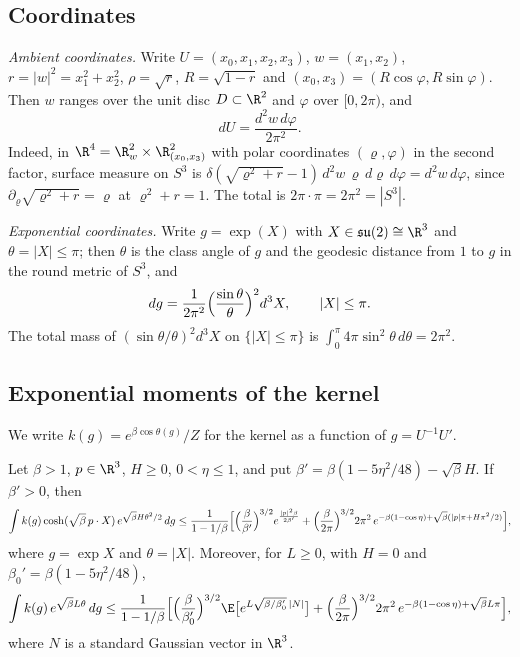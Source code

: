 \subsection{Coordinates}
\emph{Ambient coordinates.} Write $U=(x_0,x_1,x_2,x_3)$, $w=(x_1,x_2)$, $r=|w|^2=x_1^2+x_2^2$,
$\rho=\sqrt r$, $R=\sqrt{1-r}$ and $(x_0,x_3)=(R\cos\varphi,R\sin\varphi)$. Then $w$ ranges over the unit
disc $D\subset\R^2$ and $\varphi$ over $[0,2\pi)$, and
\begin{equation}\label{tu:U-eq-haar}
dU=\frac{d^2w\,d\varphi}{2\pi^2}.
\end{equation}
Indeed, in $\R^4=\R^2_w\times\R^2_{(x_0,x_3)}$ with polar coordinates $(\varrho,\varphi)$ in the second
factor, surface measure on $S^3$ is $\delta(\sqrt{\varrho^2+r}-1)\,d^2w\,\varrho\,d\varrho\,d\varphi=d^2w\,d\varphi$,
since $\partial_\varrho\sqrt{\varrho^2+r}=\varrho$ at $\varrho^2+r=1$. The total is
$2\pi\cdot\pi=2\pi^2=|S^3|$.

\emph{Exponential coordinates.} Write $g=\exp(X)$ with $X\in\mathfrak{su}(2)\cong\R^3$ and
$\theta=|X|\le\pi$; then $\theta$ is the class angle of $g$ and the geodesic distance from $1$ to $g$
in the round metric of $S^3$, and
\begin{equation}\label{tu:U-eq-exp}
dg=\frac{1}{2\pi^2}\Bigl(\frac{\sin\theta}{\theta}\Bigr)^2d^3X,\qquad |X|\le\pi .
\end{equation}
The total mass of $(\sin\theta/\theta)^2d^3X$ on $\{|X|\le\pi\}$ is $\int_0^\pi4\pi\sin^2\theta\,d\theta=2\pi^2$.

\subsection{Exponential moments of the kernel}

We write $k(g)=e^{\beta\cos\theta(g)}/Z$ for the kernel as a function of $g=U^{-1}U'$.

\begin{lemma}[Lemma K]\label{tu:U-K}
Let $\beta>1$, $p\in\R^3$, $H\ge0$, $0<\eta\le1$, and put $\beta'=\beta(1-5\eta^2/48)-\sqrt\beta H$.
If $\beta'>0$, then
\[
\int k(g)\cosh(\sqrt\beta\,p\cdot X)\,e^{\sqrt\beta H\theta^2/2}\,dg\le
\frac{1}{1-1/\beta}\Bigl[\Bigl(\frac{\beta}{\beta'}\Bigr)^{3/2}e^{\frac{|p|^2\beta}{2\beta'}}
+\Bigl(\frac{\beta}{2\pi}\Bigr)^{3/2}2\pi^2\,e^{-\beta(1-\cos\eta)+\sqrt\beta(|p|\pi+H\pi^2/2)}\Bigr],
\]
where $g=\exp X$ and $\theta=|X|$. Moreover, for $L\ge0$, with $H=0$ and $\beta_0'=\beta(1-5\eta^2/48)$,
\[
\int k(g)\,e^{\sqrt\beta L\theta}\,dg\le
\frac{1}{1-1/\beta}\Bigl[\Bigl(\frac{\beta}{\beta_0'}\Bigr)^{3/2}\E\bigl[e^{L\sqrt{\beta/\beta_0'}\,|N|}\bigr]
+\Bigl(\frac{\beta}{2\pi}\Bigr)^{3/2}2\pi^2\,e^{-\beta(1-\cos\eta)+\sqrt\beta L\pi}\Bigr],
\]
where $N$ is a standard Gaussian vector in $\R^3$.
\end{lemma}

